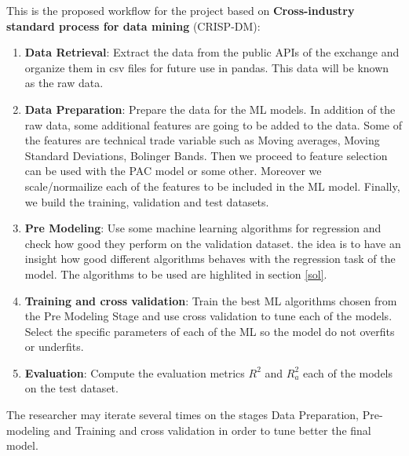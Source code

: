 \documentclass{article}
\begin{document}
This is the proposed workflow for the project based on \textbf{ Cross-industry standard process for data mining} (CRISP-DM):
\begin{enumerate}
\item \textbf{Data Retrieval}: Extract the data from the public APIs of the exchange and organize them in csv files for future use in pandas. This data will be known as the raw data.

\item \textbf{Data Preparation}: Prepare the data for the ML models. In addition of the raw data, some additional features are going to be added to the data. Some of the features are technical trade variable such as Moving averages, Moving Standard Deviations, Bolinger Bands. Then we proceed to feature selection can be used with the PAC model or some other. Moreover we scale/normailize each of the features to be included in the ML model. Finally, we build the training, validation and test datasets.

\item \textbf{Pre Modeling}: Use some machine learning algorithms for regression and check how good they perform on the validation dataset. the idea is to have an insight how good different algorithms behaves with the regression task of the model. The algorithms to be used are highlited in section \ref{sol}.

\item \textbf{Training and cross validation}: Train the best ML algorithms chosen from the Pre Modeling Stage and use cross validation to tune each of the models. Select the specific parameters of each of the ML so the model do not overfits or underfits.

\item \textbf{Evaluation}: Compute the evaluation metrics $ R^2 $ and $ R^2_a $  each of the models on the test dataset.


\end{enumerate}


The researcher may iterate several times on the stages Data Preparation, Pre-modeling and Training and cross validation in order to tune better the final model.





\end{document}
